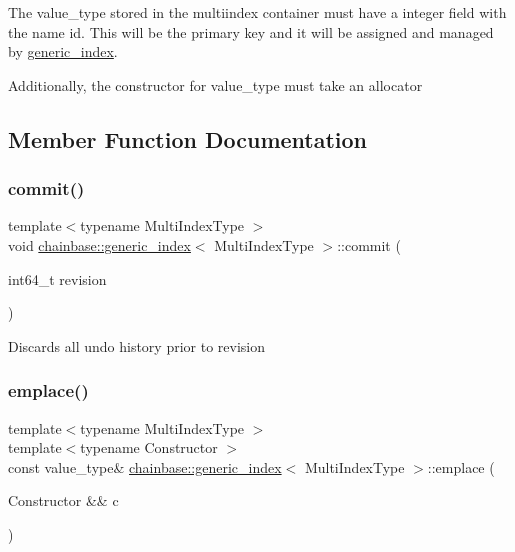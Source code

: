 The value\+\_\+type stored in the multiindex container must have a integer field with the name \textquotesingle{}id\textquotesingle{}. This will be the primary key and it will be assigned and managed by \mbox{\hyperlink{classchainbase_1_1generic__index}{generic\+\_\+index}}.

Additionally, the constructor for value\+\_\+type must take an allocator 

\subsection{Member Function Documentation}
\mbox{\label{classchainbase_1_1generic__index_a5e23184f8b0100dbfdc0422bd21093fd}} 
\subsubsection{\texorpdfstring{commit()}{commit()}}
{\footnotesize\ttfamily template$<$typename Multi\+Index\+Type $>$ \\
void \mbox{\hyperlink{classchainbase_1_1generic__index}{chainbase\+::generic\+\_\+index}}$<$ Multi\+Index\+Type $>$\+::commit (\begin{DoxyParamCaption}\item[{int64\+\_\+t}]{revision }\end{DoxyParamCaption})\hspace{0.3cm}{\ttfamily [inline]}}

Discards all undo history prior to revision \mbox{\label{classchainbase_1_1generic__index_aac56dbf8418aa149530d66758c53cf34}} 
\subsubsection{\texorpdfstring{emplace()}{emplace()}}
{\footnotesize\ttfamily template$<$typename Multi\+Index\+Type $>$ \\
template$<$typename Constructor $>$ \\
const value\+\_\+type\& \mbox{\hyperlink{classchainbase_1_1generic__index}{chainbase\+::generic\+\_\+index}}$<$ Multi\+Index\+Type $>$\+::emplace (\begin{DoxyParamCaption}\item[{Constructor \&\&}]{c }\end{DoxyParamCaption})\hspace{0.3cm}{\ttfamily [inline]}}

